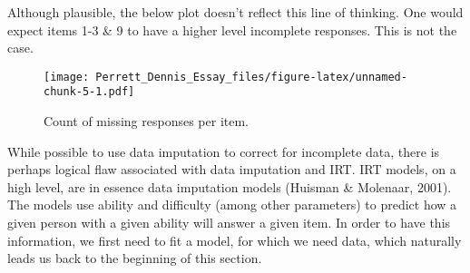 \documentclass[
  man,floatsintext]{apa6}
\begin{document}
\begin{table}[H]
\centering\begingroup\fontsize{7}{9}\selectfont

\endgroup{}
\end{table}
\normalsize

Although plausible, the below plot doesn't reflect this line of thinking. One would expect items 1-3 \& 9 to have a higher level incomplete responses. This is not the case.

\begin{figure}
\centering
\texttt{[image: Perrett\_Dennis\_Essay\_files/figure-latex/unnamed-chunk-5-1.pdf]}
\caption{\label{fig:unnamed-chunk-5}Count of missing responses per item.}
\end{figure}

While possible to use data imputation to correct for incomplete data, there is perhaps logical flaw associated with data imputation and IRT. IRT models, on a high level, are in essence data imputation models (Huisman \& Molenaar, 2001). The models use ability and difficulty (among other parameters) to predict how a given person with a given ability will answer a given item. In order to have this information, we first need to fit a model, for which we need data, which naturally leads us back to the beginning of this section.
\end{document}
